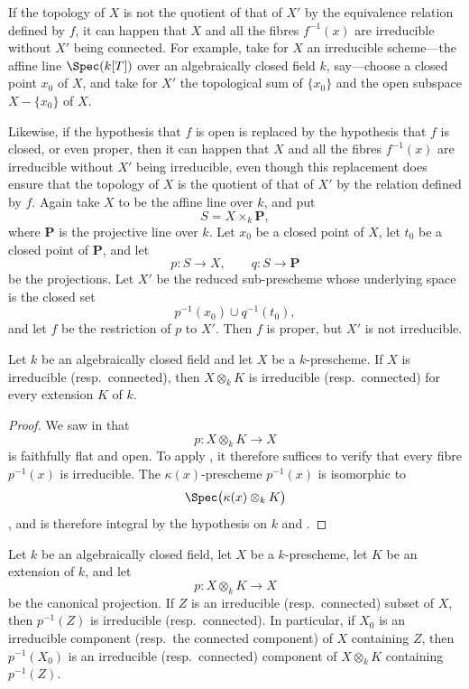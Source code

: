 \begin{remark}[4.4.3]
\label{IV.4.4.3}
If the topology of $X$ is not the quotient of that of $X'$ by the
equivalence relation defined by $f$, it can happen that $X$ and all the
fibres $f^{-1}(x)$ are irreducible without $X'$ being connected.
For example, take for $X$ an irreducible scheme---the affine line
$\Spec(k[T])$ over an algebraically closed field $k$, say---choose a
closed point $x_0$ of $X$, and take for $X'$ the topological sum of
$\{x_0\}$ and the open subspace $X-\{x_0\}$ of $X$.

Likewise, if the hypothesis that $f$ is open is replaced by the
hypothesis that $f$ is closed, or even proper, then it can happen that
$X$ and all the fibres $f^{-1}(x)$ are irreducible without $X'$ being
irreducible, even though this replacement does ensure that the topology
of $X$ is the quotient of that of $X'$ by the relation defined by $f$.
Again take $X$ to be the affine line over $k$, and put
\[
S=X\times_k\mathbf P,
\]
where $\mathbf P$ is the projective line over $k$.
Let $x_0$ be a closed point of $X$, let $t_0$ be a closed point of
$\mathbf P$, and let
\[
p:S\longrightarrow X,
\qquad
q:S\longrightarrow\mathbf P
\]
be the projections.
Let $X'$ be the reduced sub-prescheme whose underlying space is the
closed set
\[
p^{-1}(x_0)\cup q^{-1}(t_0),
\]
and let $f$ be the restriction of $p$ to $X'$.
Then $f$ is proper, but $X'$ is not irreducible.
\end{remark}

\begin{theorem}[4.4.4]
\label{IV.4.4.4}
Let $k$ be an algebraically closed field and let $X$ be a
$k$-prescheme.
If $X$ is irreducible (resp.\ connected), then $X\otimes_k K$ is
irreducible (resp.\ connected) for every extension $K$ of $k$.
\end{theorem}

\begin{proof}
We saw in  that
\[
p:X\otimes_k K\longrightarrow X
\]
is faithfully flat and open.
To apply , it therefore suffices to verify that every
fibre $p^{-1}(x)$ is irreducible.
The $\kappa(x)$-prescheme $p^{-1}(x)$ is isomorphic to
\[
\Spec\bigl(\kappa(x)\otimes_k K\bigr)
\]
, and is therefore integral by the hypothesis on $k$
and .
\end{proof}

\begin{corollary}[4.4.5]
\label{IV.4.4.5}
Let $k$ be an algebraically closed field, let $X$ be a $k$-prescheme,
let $K$ be an extension of $k$, and let
\[
p:X\otimes_k K\longrightarrow X
\]
be the canonical projection.
If $Z$ is an irreducible (resp.\ connected) subset of $X$, then
$p^{-1}(Z)$ is irreducible (resp.\ connected).
In particular, if $X_0$ is an irreducible component
(resp.\ the connected component) of $X$ containing $Z$, then
$p^{-1}(X_0)$ is an irreducible (resp.\ connected) component of
$X\otimes_k K$ containing $p^{-1}(Z)$.
\end{corollary}


